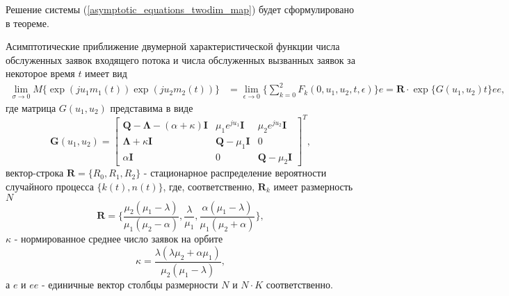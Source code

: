 Решение системы (\ref{asymptotic_equations_twodim_map}) будет сформулировано в теореме.
\begin{theorem}
	Асимптотические приближение двумерной характеристической функции числа обслуженных заявок входящего потока и числа обслуженных вызванных заявок за некоторое время $t$ имеет вид
	\begin{equation*} \label{theorem_twodim_map}
		\begin{split}
		  \lim_{\sigma \xrightarrow{} 0} M\{\exp(ju_{1}m_{1}(t))\exp(ju_{2}m_{2}(t))\} &= 
			 \lim_{\epsilon \xrightarrow{} 0} \{ \sum_{k=0}^{2}F_{k}(0,u_{1},u_{2},t,\epsilon) \}e = \boldsymbol{R} \cdot \exp\{G(u_{1},u_{2})t\}ee,
		\end{split}
	\end{equation*}
	где матрица $G(u_{1},u_{2})$ представима в виде
	\begin{equation*}
		\boldsymbol{G}(u_{1},u_{2})=\begin{bmatrix}
			\boldsymbol{Q}-\boldsymbol{\Lambda}-(\alpha + \kappa)\boldsymbol{I} & \mu_{1}e^{ju_{1}}\boldsymbol{I} &  \mu_{2}e^{ju_{2}}\boldsymbol{I}\\
			\boldsymbol{\Lambda}+\kappa\boldsymbol{I} & \boldsymbol{Q}-\mu_{1}\boldsymbol{I} & 0\\
			\alpha\boldsymbol{I} & 	0 &	\boldsymbol{Q}-\mu_{2}\boldsymbol{I}
		\end{bmatrix}^{T},
	\end{equation*}
	вектор-строка $\boldsymbol{R}=\{R_{0},R_{1},R_{2}\}$ - стационарное распределение вероятности случайного процесса $\{k(t),n(t)\}$, где, соответственно,  $\boldsymbol{R}_{k}$ имеет размерность $N$
	\begin{equation*}
		\boldsymbol{R}=\{\frac{\mu_{2}(\mu_{1} - \lambda)}{\mu_{1}(\mu_{2} - \alpha)},\frac{\lambda}{\mu_{1}},\frac{\alpha(\mu_{1} - \lambda)}{\mu_{1}(\mu_{2} + \alpha)}\},
	\end{equation*}
	$\kappa$ - нормированное среднее число заявок на орбите
	\begin{equation*}
		\kappa = \frac{\lambda(\lambda \mu_{2} + \alpha \mu_{1})}{\mu_{2}(\mu_{1} - \lambda)},
	\end{equation*}
	 а $e$ и $ee$ - единичные вектор столбцы размерности $N$ и $N \cdot K$ соответственно.
\end{theorem}
